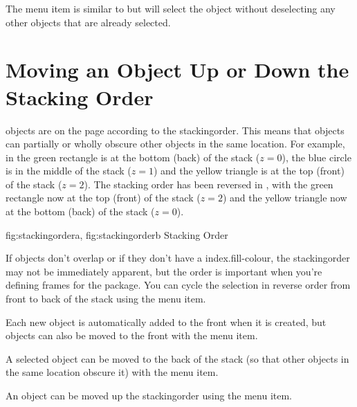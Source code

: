 
The  menu item is similar to 
 but will select the \gls{object}
without deselecting any other \glspl{object} that are already
selected.

\section{Moving an Object Up or Down the Stacking Order}\label{sec:moveupordown}

\Glspl{object} are  on the page according to the
\gls{stackingorder}. This means that objects can
partially or wholly obscure other objects in the same location.
For example, in  the green rectangle is
at the bottom (\gls{back}) of the stack ($z=0$), the blue circle is in
the middle of the stack ($z=1$) and the yellow triangle is at the
top (\gls{front}) of the stack ($z=2$). The stacking order has
been reversed in , with the green
rectangle now at the top (front) of the stack ($z=2$) and
the yellow triangle now at the bottom (back) of the stack
($z=0$).

{
  {fig:stackingordera}{}{},
  {fig:stackingorderb}{}{}
}
{Stacking Order}

If \glspl{object} don't overlap or if they don't have a
\gls{index.fill-colour}, the \gls{stackingorder} may not be
immediately apparent, but the order is important when you're
defining frames for the  package. You can cycle the
selection in reverse order from front to back of the stack using the
 menu item.


Each new \gls{object} is automatically added to the \gls{front} when it is
created, but \glspl{object} can also be moved to the \gls{front} 
with the  menu item.


A selected \gls{object} can be moved to the
\gls{back} of the \gls{stack} (so that other \glspl{object} in the
same location obscure it) with the  menu item.


An object can be moved up the \gls{stackingorder} using
the  menu item.

